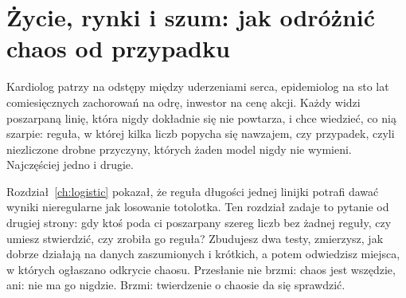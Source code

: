 
\chapter{Życie, rynki i szum: jak odróżnić chaos od przypadku}
\label{ch:life}

\noindent
Kardiolog patrzy na odstępy między uderzeniami serca, epidemiolog na sto lat
comiesięcznych zachorowań na odrę, inwestor na cenę akcji. Każdy widzi
poszarpaną linię, która nigdy dokładnie się nie powtarza, i chce wiedzieć, co
nią szarpie: reguła, w której kilka liczb popycha się nawzajem, czy przypadek,
czyli niezliczone drobne przyczyny, których żaden model nigdy nie wymieni.
Najczęściej jedno i drugie.

Rozdział~\ref{ch:logistic} pokazał, że reguła długości jednej linijki potrafi
dawać wyniki nieregularne jak losowanie totolotka. Ten rozdział zadaje to
pytanie od drugiej strony: gdy ktoś poda ci poszarpany szereg liczb bez
żadnej reguły, czy umiesz stwierdzić, czy zrobiła go reguła? Zbudujesz dwa
testy, zmierzysz, jak dobrze działają na danych zaszumionych i krótkich, a
potem odwiedzisz miejsca, w których ogłaszano odkrycie chaosu. Przesłanie nie
brzmi: chaos jest wszędzie, ani: nie ma go nigdzie. Brzmi: twierdzenie o
chaosie da się sprawdzić.

\begin{outcomes}
\end{outcomes}

